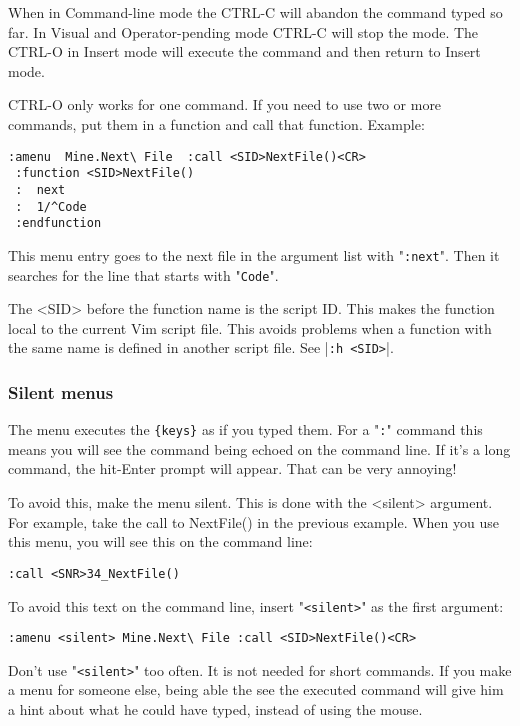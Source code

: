 When in Command-line mode the CTRL-C will abandon the command typed so far.
In Visual and Operator-pending mode CTRL-C will stop the mode.
The CTRL-O in Insert mode will execute the command and then return to Insert mode.

CTRL-O only works for one command.
If you need to use two or more commands, put them in a function and call that function.
Example:

\begin{Verbatim}[samepage=true]
 :amenu  Mine.Next\ File  :call <SID>NextFile()<CR>
 :function <SID>NextFile()
 :  next
 :  1/^Code
 :endfunction
\end{Verbatim}

This menu entry goes to the next file in the argument list with "\verb!:next!".
Then it searches for the line that starts with "\verb!Code!".

The <SID> before the function name is the script ID.
This makes the function local to the current Vim script file.
This avoids problems when a function with the same name is defined in another script file.
See |\verb!:h <SID>!|.

\subsubsection{Silent menus}
The menu executes the \verb!{keys}! as if you typed them.
For a "\verb!:!" command this means you will see the command being echoed on the command line.
If it's a long command, the hit-Enter prompt will appear.
That can be very annoying!

To avoid this, make the menu silent.
This is done with the <silent> argument.
For example, take the call to NextFile() in the previous example.
When you use this menu, you will see this on the command line:

\begin{Verbatim}[samepage=true]
    :call <SNR>34_NextFile() 
\end{Verbatim}

To avoid this text on the command line, insert "\verb!<silent>!" as the first argument:

\begin{Verbatim}[samepage=true]
 :amenu <silent> Mine.Next\ File :call <SID>NextFile()<CR>
\end{Verbatim}

Don't use "\verb!<silent>!" too often.
It is not needed for short commands.
If you make a menu for someone else, being able the see the executed command will give him a hint about what he could have typed, instead of using the mouse.

